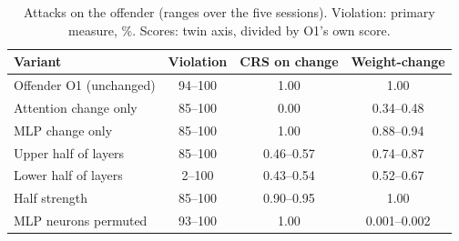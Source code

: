 \begin{table}[t]\centering\caption{Attacks on the offender (ranges over the five sessions). Violation: primary measure, \%. Scores: twin axis, divided by O1's own score.}\label{tab:attacks}
\footnotesize\begin{tabular}{@{}lccc@{}}\toprule
Variant & Violation & CRS on change & Weight-change \\\midrule
Offender O1 (unchanged) & 94--100 & 1.00 & 1.00 \\
Attention change only & 85--100 & 0.00 & 0.34--0.48 \\
MLP change only & 85--100 & 1.00 & 0.88--0.94 \\
Upper half of layers & 85--100 & 0.46--0.57 & 0.74--0.87 \\
Lower half of layers & 2--100 & 0.43--0.54 & 0.52--0.67 \\
Half strength & 85--100 & 0.90--0.95 & 1.00 \\
MLP neurons permuted & 93--100 & 1.00 & 0.001--0.002 \\
\bottomrule\end{tabular}\end{table}